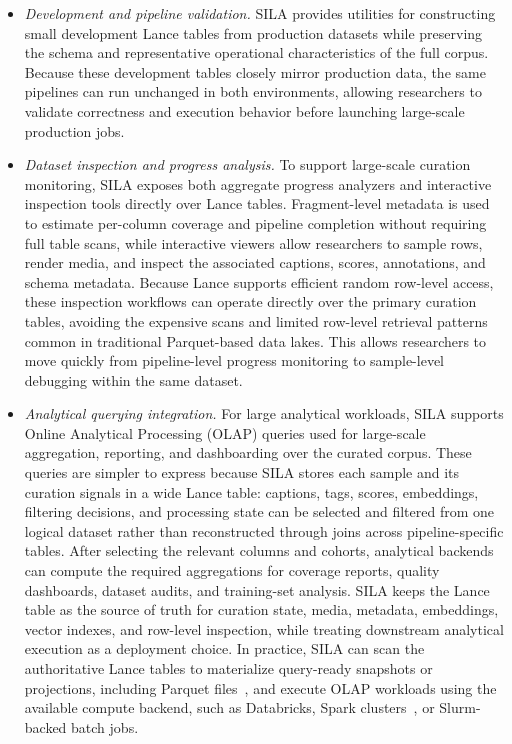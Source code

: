 \begin{itemize}

\item \textit{Development and pipeline validation.}
SILA provides utilities for constructing small development Lance tables from production datasets while preserving the schema and representative operational characteristics of the full corpus. Because these development tables closely mirror production data, the same pipelines can run unchanged in both environments, allowing researchers to validate correctness and execution behavior before launching large-scale production jobs.

\item \textit{Dataset inspection and progress analysis.}
To support large-scale curation monitoring, SILA exposes both aggregate progress analyzers and interactive inspection tools directly over Lance tables. Fragment-level metadata is used to estimate per-column coverage and pipeline completion without requiring full table scans, while interactive viewers allow researchers to sample rows, render media, and inspect the associated captions, scores, annotations, and schema metadata. Because Lance supports efficient random row-level access, these inspection workflows can operate directly over the primary curation tables, avoiding the expensive scans and limited row-level retrieval patterns common in traditional Parquet-based data lakes. This allows researchers to move quickly from pipeline-level progress monitoring to sample-level debugging within the same dataset.

\item \textit{Analytical querying integration.}
For large analytical workloads, SILA supports Online Analytical Processing (OLAP) queries used for large-scale aggregation, reporting, and dashboarding over the curated corpus. These queries are simpler to express because SILA stores each sample and its curation signals in a wide Lance table: captions, tags, scores, embeddings, filtering decisions, and processing state can be selected and filtered from one logical dataset rather than reconstructed through joins across pipeline-specific tables. After selecting the relevant columns and cohorts, analytical backends can compute the required aggregations for coverage reports, quality dashboards, dataset audits, and training-set analysis. SILA keeps the Lance table as the source of truth for curation state, media, metadata, embeddings, vector indexes, and row-level inspection, while treating downstream analytical execution as a deployment choice. In practice, SILA can scan the authoritative Lance tables to materialize query-ready snapshots or projections, including Parquet files~\citep{parquet2013}, and execute OLAP workloads using the available compute backend, such as Databricks, Spark clusters~\citep{zaharia2016apache}, or Slurm-backed batch jobs.

\end{itemize}

